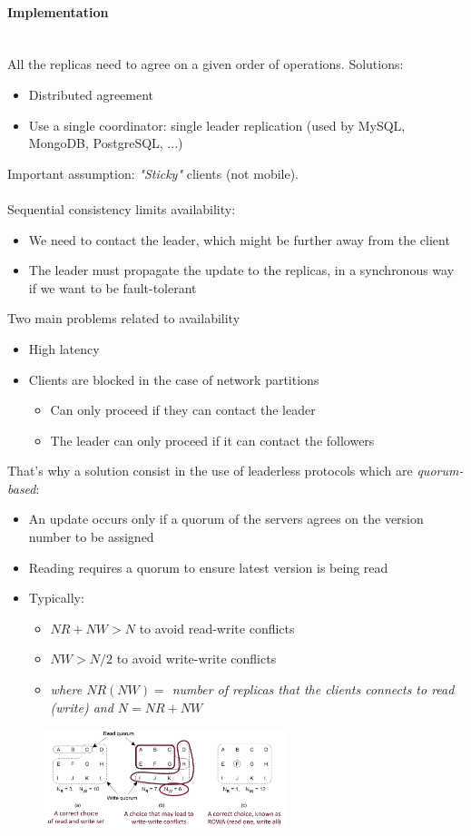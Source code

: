 \documentclass[10pt,a4paper]{article}
\newcommand{\myparagraph}[1]{\paragraph{#1}\mbox{}\\[0.05in]}
\begin{document}
\myparagraph{Implementation}
All the replicas need to agree on a given order of operations. Solutions:
\begin{itemize}
	\item Distributed agreement 
	\item Use a single coordinator: single leader replication (used by MySQL, MongoDB, PostgreSQL, ...)
\end{itemize}
Important assumption: \textit{"Sticky"} clients (not mobile). \\ \\
Sequential consistency limits availability:
\begin{itemize}
	\item We need to contact the leader, which might be further away from the client
	\item The leader must propagate the update to the replicas, in a synchronous way if we want to be fault-tolerant
\end{itemize}
Two main problems related to availability
\begin{itemize}
	\item High latency
	\item Clients are blocked in the case of network partitions
	\begin{itemize}
		\item Can only proceed if they can contact the leader
		\item The leader can only proceed if it can contact the followers
	\end{itemize}
\end{itemize}
That's why a solution consist in the use of leaderless protocols which are \textit{quorum-based}:
\begin{itemize}
	\item An update occurs only if a quorum of the servers agrees on the version number to be assigned
	\item Reading requires a quorum to ensure latest version is being read
	\item Typically:
	\begin{itemize}
		\item $NR + NW > N$ to avoid read-write conflicts
		\item$NW > N/2$ to avoid write-write conflicts
		\item \textit{where $NR(NW)=$ number of replicas that the clients connects to read (write) and $N=NR+NW$}
	\end{itemize}
\end{itemize}
\begin{figure}[h!]
 \hfill \includegraphics[width=200pt]{images/leaderless.png}\hspace*{\fill}
  \label{fig:leaderless}
\end{figure}
\end{document}
